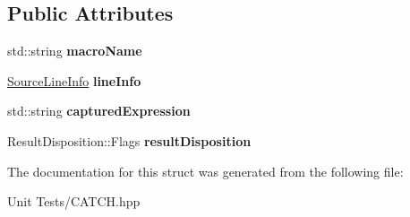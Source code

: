 \subsection*{Public Attributes}
\begin{DoxyCompactItemize}
\item 
std\+::string {\bfseries macro\+Name}\hypertarget{structCatch_1_1AssertionInfo_ac2e59e8c89e00eb3390768f50d540b18}{}\label{structCatch_1_1AssertionInfo_ac2e59e8c89e00eb3390768f50d540b18}

\item 
\hyperlink{structCatch_1_1SourceLineInfo}{Source\+Line\+Info} {\bfseries line\+Info}\hypertarget{structCatch_1_1AssertionInfo_a17bdbb404ba12658034f833be2f4c3e7}{}\label{structCatch_1_1AssertionInfo_a17bdbb404ba12658034f833be2f4c3e7}

\item 
std\+::string {\bfseries captured\+Expression}\hypertarget{structCatch_1_1AssertionInfo_af7c1d3cbfa346e9a303030fa0ef0cb54}{}\label{structCatch_1_1AssertionInfo_af7c1d3cbfa346e9a303030fa0ef0cb54}

\item 
Result\+Disposition\+::\+Flags {\bfseries result\+Disposition}\hypertarget{structCatch_1_1AssertionInfo_a60353b3632ab2f827162f2b2d6911073}{}\label{structCatch_1_1AssertionInfo_a60353b3632ab2f827162f2b2d6911073}

\end{DoxyCompactItemize}


The documentation for this struct was generated from the following file\+:\begin{DoxyCompactItemize}
\item 
Unit Tests/C\+A\+T\+C\+H.\+hpp\end{DoxyCompactItemize}
